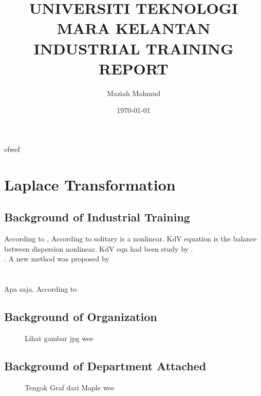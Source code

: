 \documentclass[l2pt]{report}
\begin{document}
\title{UNIVERSITI TEKNOLOGI MARA KELANTAN\\ INDUSTRIAL TRAINING REPORT }         %

\author{Maziah Mahmud}        %
\date{\today}          %
\maketitle


\tableofcontents
efwef
\listoffigures

\listoftables




\chapter{Laplace Transformation}       %

\section{Background of Industrial Training}       %

According to \citet{Bat-67}, According to  solitary is a nonlinear. KdV equation is the balance between dispersion nonlinear\citep{charles-12}. KdV eqn had been study by \citep{jy-04}. \\
. A new method was proposed by \citet{nor-14}\\
\\
\\
Apa saja. According to \citet{han-15}

\section{Background of Organization}       %


 \begin{figure}[h!]
\centering
\caption{Lihat gambar jpg wee}
\end{figure}

\vspace{3cm}
\section{Background of Department Attached}       %
  \begin{figure}[h!]
\centering
\caption{Tengok Graf dari Maple wee}
\end{figure}
\end{document}
